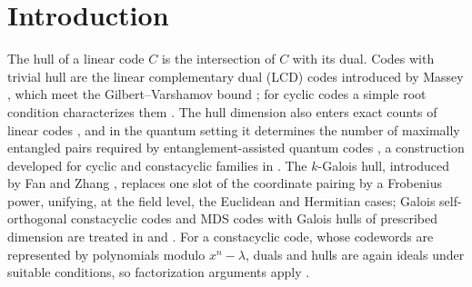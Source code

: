 \documentclass[preprint,12pt,a4paper]{elsarticle}
\theoremstyle{definition}
\theoremstyle{remark}
\begin{document}
\section{Introduction}\label{sec:intro}
The hull of a linear code $C$ is the intersection of $C$ with its dual.
Codes with trivial hull are the linear complementary dual (LCD) codes
introduced by Massey \cite{massey1992}, which meet the Gilbert--Varshamov
bound \cite{sendrier2004}; for cyclic codes a simple root condition
characterizes them \cite{yangMassey1994}. The hull dimension also enters exact
counts of linear codes \cite{sendrier1997}, and in the quantum setting it
determines the number of maximally entangled pairs required by
entanglement-assisted quantum codes \cite{brun2006,wildeBrun2008}, a
construction developed for cyclic and constacyclic families in
\cite{guendaJitmanGulliver2018}. The
$k$-Galois hull, introduced by Fan and Zhang \cite{fanZhang2017}, replaces
one slot of the coordinate pairing by a Frobenius power, unifying, at the
field level, the Euclidean and Hermitian cases; Galois self-orthogonal
constacyclic codes and MDS codes with Galois hulls of prescribed dimension are
treated in \cite{fuLiu2022} and \cite{cao2021}. For a constacyclic code, whose codewords are
represented by polynomials modulo $x^n-\lambda$, duals and hulls are again
ideals under suitable conditions, so factorization arguments apply
\cite{huffmanPless2003}.
\end{document}
